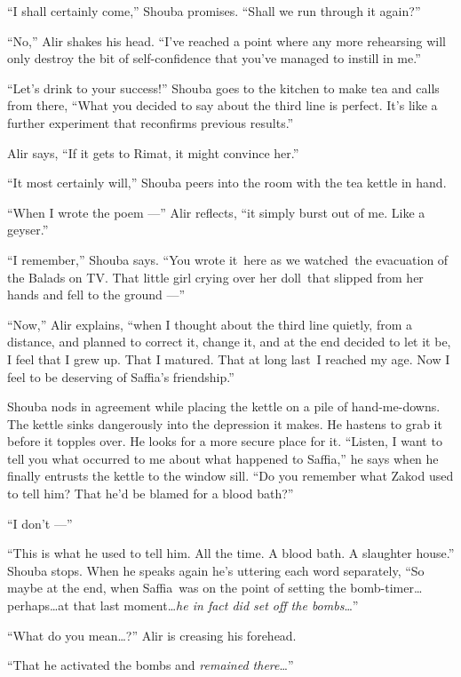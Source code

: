 \documentclass[twoside,11pt,openany]{book}
\begin{document}
``I shall certainly come,'' Shouba promises. ``Shall we run through it
again?''

``No,'' Alir shakes his head. ``I've reached a point where any
more rehearsing will only destroy the bit of self-confidence that you've managed to instill in me.''

``Let's drink to your success!'' Shouba goes to the kitchen to make tea and calls from there,
``What you decided to say about the third line is perfect. It's like a further experiment that reconfirms
previous results.''

Alir says, ``If it gets to Rimat, it might convince her.''

``It most certainly will,'' Shouba peers into the room with the tea kettle in hand.

``When I wrote the poem ---'' Alir reflects, ``it simply burst out of me. Like a geyser.''

``I remember,'' Shouba says. ``You wrote it~here as we watched~the evacuation of
the Balads on TV. That little girl crying over her doll~that slipped from her hands and fell to the ground ---''

``Now,'' Alir explains, ``when I thought about the third line quietly, from a
distance, and planned to correct it, change it, and at the end decided to let it be, I feel that I grew up. That I
matured. That at long last~I reached my age. Now I feel to be deserving of Saffia's friendship.''

Shouba nods in agreement while placing the kettle on a pile of hand-me-downs. The kettle sinks dangerously into the
depression it makes. He hastens to grab it before it topples over. He looks for a more secure place for it.
``Listen, I want to tell you what occurred to me about what happened to Saffia,'' he says
when he finally entrusts the kettle to the window sill. ``Do you remember what Zakod used to tell him?
That he'd be blamed for a blood bath?''

``I don't ---''

``This is what he used to tell him. All the time. A blood bath. A slaughter house.'' Shouba
stops. When he speaks again he's uttering each word separately, ``So maybe at the end, when Saffia~was
on the point of setting the bomb-timer{\ldots}perhaps{\ldots}at that last moment{\ldots}\textit{he in fact did set off
the bombs}{\ldots}''

``What do you mean{\ldots}?'' Alir is creasing his forehead.

``That he activated the bombs and \textit{remained there}{\ldots}''
\end{document}
